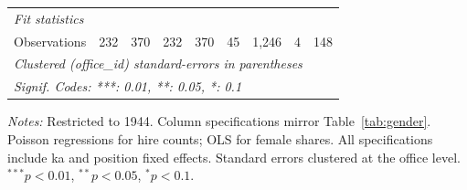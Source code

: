\begin{table}[htbp]
\begin{threeparttable}
\begin{tabular}{lcccccccc}
   \midrule
   \emph{Fit statistics}\\
   Observations                & 232                         & 370                       & 232                         & 370                       & 45                                  & 1,246                               & 4                                   & 148\\  
   \midrule \midrule
   \multicolumn{9}{l}{\emph{Clustered (office\_id) standard-errors in parentheses}}\\
   \multicolumn{9}{l}{\emph{Signif. Codes: ***: 0.01, **: 0.05, *: 0.1}}\\
\end{tabular}
\par\endgroup
\begin{tablenotes}[flushleft]
\footnotesize
\item \textit{Notes:} Restricted to 1944. Column specifications mirror Table~\ref{tab:gender}. Poisson regressions for hire counts; OLS for female shares. All specifications include ka and position fixed effects. Standard errors clustered at the office level. $^{***}p<0.01$, $^{**}p<0.05$, $^{*}p<0.1$.
\end{tablenotes}
\end{threeparttable}
\end{table}
